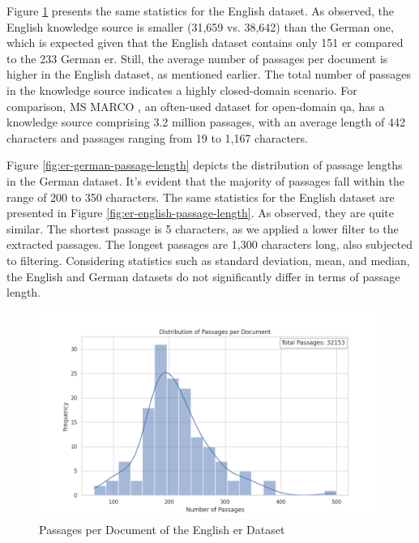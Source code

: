 Figure \ref{fig:er-english-passage-document} presents the same statistics for the English dataset. As observed, the English knowledge source is smaller (31,659 vs. 38,642) than the German one, which is expected given that the English dataset contains only 151 \gls{er} compared to the 233 German \gls{er}. Still, the average number of passages per document is higher in the English dataset, as mentioned earlier. The total number of passages in the knowledge source indicates a highly closed-domain scenario. For comparison, MS MARCO \cite{bajaj2016ms}, an often-used dataset for open-domain \gls{qa}, has a knowledge source comprising 3.2 million passages, with an average length of 442 characters and passages ranging from 19 to 1,167 characters.

Figure \ref{fig:er-german-passage-length} depicts the distribution of passage lengths in the German dataset. It's evident that the majority of passages fall within the range of 200 to 350 characters. The same statistics for the English dataset are presented in Figure \ref{fig:er-english-passage-length}. As observed, they are quite similar. The shortest passage is 5 characters, as we applied a lower filter to the extracted passages. The longest passages are 1,300 characters long, also subjected to filtering. Considering statistics such as standard deviation, mean, and median, the English and German datasets do not significantly differ in terms of passage length.


\begin{figure}[H]
    \centering
    \includegraphics[width=\textwidth]{Grafiken/Statistiken/IndexEnglish_Passages_Distribution.png}
    \caption{Passages per Document of the English \gls{er} Dataset}
    \label{fig:er-english-passage-document}
\end{figure}

